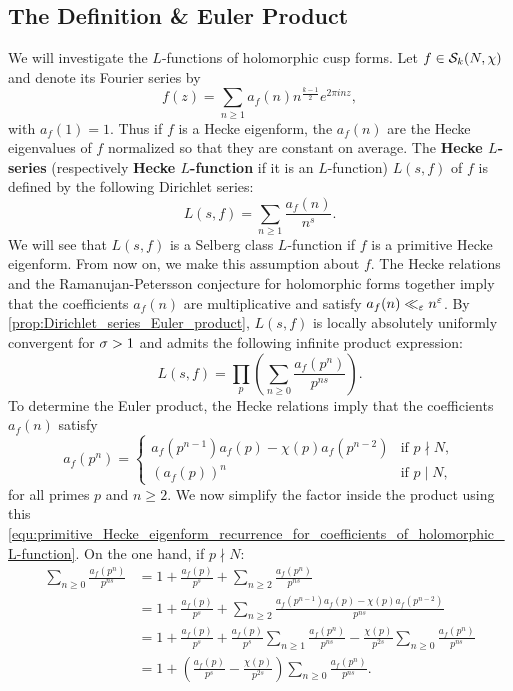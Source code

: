    \subsection*{The Definition \& Euler Product}
      We will investigate the $L$-functions of holomorphic cusp forms. Let $f \in \mathcal{S}_{k}(N,\chi)$ and denote its Fourier series by
      \[
        f(z) = \sum_{n \ge 1}a_{f}(n)n^{\frac{k-1}{2}}e^{2\pi inz},
      \]
      with $a_{f}(1) = 1$. Thus if $f$ is a Hecke eigenform, the $a_{f}(n)$ are the Hecke eigenvalues of $f$ normalized so that they are constant on average. The \textbf{Hecke $L$-series} (respectively \textbf{Hecke $L$-function} if it is an $L$-function) $L(s,f)$ of $f$ is defined by the following Dirichlet series:
      \[
        L(s,f) = \sum_{n \ge 1}\frac{a_{f}(n)}{n^{s}}.
      \]
      We will see that $L(s,f)$ is a Selberg class $L$-function if $f$ is a primitive Hecke eigenform. From now on, we make this assumption about $f$. The Hecke relations and the Ramanujan-Petersson conjecture for holomorphic forms together imply that the coefficients $a_{f}(n)$ are multiplicative and satisfy $a_{f}(n) \ll_{\varepsilon} n^{\varepsilon}$. By \cref{prop:Dirichlet_series_Euler_product}, $L(s,f)$ is locally absolutely uniformly convergent for $\sigma > 1$ and admits the following infinite product expression:
      \[
        L(s,f) = \prod_{p}\left(\sum_{n \ge 0}\frac{a_{f}(p^{n})}{p^{ns}}\right).
      \]
      To determine the Euler product, the Hecke relations imply that the coefficients $a_{f}(n)$ satisfy
      \begin{equation}\label{equ:primitive_Hecke_eigenform_recurrence_for_coefficients_of_holomorphic_L-function}
        a_{f}(p^{n}) = \begin{cases} a_{f}(p^{n-1})a_{f}(p)-\chi(p)a_{f}(p^{n-2}) & \text{if $p \nmid N$}, \\ (a_{f}(p))^{n} & \text{if $p \mid N$}, \end{cases}
      \end{equation}
      for all primes $p$ and $n \ge 2$. We now simplify the factor inside the product using this \cref{equ:primitive_Hecke_eigenform_recurrence_for_coefficients_of_holomorphic_L-function}. On the one hand, if $p \nmid N$:
      \begin{align*}
        \sum_{n \ge 0}\frac{a_{f}(p^{n})}{p^{ns}} &= 1+\frac{a_{f}(p)}{p^{s}}+\sum_{n \ge 2}\frac{a_{f}(p^{n})}{p^{ns}} \\
        &= 1+\frac{a_{f}(p)}{p^{s}}+\sum_{n \ge 2}\frac{a_{f}(p^{n-1})a_{f}(p)-\chi(p)a_{f}(p^{n-2})}{p^{ns}} \\
        &= 1+\frac{a_{f}(p)}{p^{s}}+\frac{a_{f}(p)}{p^{s}}\sum_{n \ge 1}\frac{a_{f}(p^{n})}{p^{ns}}-\frac{\chi(p)}{p^{2s}}\sum_{n \ge 0}\frac{a_{f}(p^{n})}{p^{ns}} \\
        &= 1+\left(\frac{a_{f}(p)}{p^{s}}-\frac{\chi(p)}{p^{2s}}\right)\sum_{n \ge 0}\frac{a_{f}(p^{n})}{p^{ns}}.
      \end{align*}
